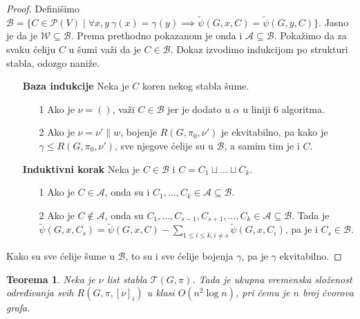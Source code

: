 \documentclass[12pt,oneside]{memoir}
\newtheorem{theorem}{Teorema}
\theoremstyle{definition}
\begin{document}
\begin{proof}
	  Definišimo $\mathcal{B} = \{C \in \mathcal{P}(V) \mid \forall x, y \
	  \gamma(x) = \gamma(y) \implies \widetilde{\psi}(G, x, C) = \widetilde{\psi}(G, y, C)\}$. Jasno je da je
	  $\mathcal{W} \subseteq \mathcal{B}$. Prema prethodno pokazanom je onda i
	  $\mathcal{A} \subseteq \mathcal{B}$.  Pokažimo da za svaku ćeliju $C$ u šumi važi
	  da je $C \in \mathcal{B}$. Dokaz izvodimo indukcijom po strukturi stabla,
	  odozgo naniže.

	  \begin{itemize}
		  \item[] \textbf{Baza indukcije} Neka je $C$ koren nekog stabla šume.
			  \begin{itemize}
				  \item[1\degree] Ako je $\nu = ()$, važi $C \in \mathcal{B}$ jer je
					  dodato u $\alpha$ u liniji 6 algoritma.
				  \item[2\degree] Ako je $\nu = \nu' \| w$, bojenje $R(G,
					  \pi_0, \nu')$ je ekvitabilno, pa kako je $\gamma \leq
					  R(G, \pi_0, \nu')$, sve njegove ćelije su u $\mathcal{B}$, a
					  samim tim je i $C$.
			  \end{itemize}
		  \item[] \textbf{Induktivni korak} Neka je $C \in \mathcal{B}$ i $C = C_1 \sqcup \dots \sqcup C_k$.
			  \begin{itemize}
				  \item[1\degree] Ako je $C \in \mathcal{A}$, onda su i $C_1, \dots,
					  C_k \in \mathcal{A} \subseteq \mathcal{B}$.
				  \item[2\degree] Ako je $C \not \in \mathcal{A}$, onda su $C_1,
					  \dots, C_{s-1}, C_{s+1}, \dots, C_k \in \mathcal{A} \subseteq
					  \mathcal{B}$. Tada je $\widetilde{\psi}(G, x, C_s) = \widetilde{\psi}(G, x, C) -
					  \sum_{1 \leq i \leq k, i \neq s} \widetilde{\psi}(G, x, C_i)$, pa je
					  i $C_s \in \mathcal{B}$.
			  \end{itemize}
	  \end{itemize}

	  Kako su sve ćelije šume u $\mathcal{B}$, to su i sve ćelije bojenja $\gamma$,
	  pa je $\gamma$ ekvitabilno.
  \end{proof}

  \begin{theorem}
	  Neka je $\nu$ list stabla $\mathcal{T}(G, \pi)$. Tada je ukupna vremenska
	  složenost određivanja svih $R(G, \pi, [\nu]_i)$ u klasi $O(n^2 \log n)$,
	  pri čemu je $n$ broj čvorova grafa.
  \end{theorem}
\end{document}
